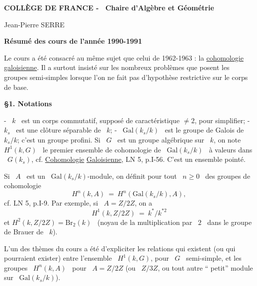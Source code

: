 \textbf{COLLÈGE DE FRANCE - \ Chaire d'Algèbre et Géométrie}

Jean-Pierre SERRE

\textbf{Résumé des cours de l'année 1990-1991}

Le cours a été consacré au même sujet que celui de 1962-1963 : la \uline{cohomologie}
\uline{galoisienne}. Il a surtout insisté sur les nombreux problèmes que posent les
groupes semi-simples lorsque l'on ne fait pas d'hypothèse restrictive sur
le corps de base.

\textbf{§1. Notations}

- \ $k$ \ est un corps commutatif, supposé de caractéristique $\neq 2$, pour simplifier;
- $k_s$ \ est une clôture séparable de \ $k$;
- \ $\mathrm{Gal}(k_s/k)$ \ est le groupe de Galois de \ $k_s/k$; c'est un groupe profini.
Si \ $G$ \ est un groupe algébrique sur \ $k$, on note \ $H^1(k, G)$ \ le premier
ensemble de cohomologie de \ $\mathrm{Gal}(k_s/k)$ \ à valeurs dans \ $G(k_s)$, cf. \uline{Cohomologie}
\uline{Galoisienne}, LN 5, p.I-56. C'est un ensemble pointé.

Si \ $A$ \ est un \ $\mathrm{Gal}(k_s/k)$-module, on définit pour tout \ $n \geqslant 0$ \ des groupes de
cohomologie
\[ H^n(k, A) \ = \ H^n(\mathrm{Gal}(k_s/k), A), \]
cf. LN 5, p.I-9.
Par exemple, si \ $A = Z/2Z$, on a
\[ H^1(k, Z/2Z) \ = \ k^*/k^{*2} \]
et
\quad $H^2(k, Z/2Z) = \mathrm{Br}_2(k)$ \ (noyau de la multiplication par \ $2$ \ dans le groupe
de Brauer de \ $k$).

L'un des thèmes du cours a été d'expliciter les relations qui existent
(ou qui pourraient exister) entre l'ensemble \ $H^1(k, G)$, pour \ $G$ \ semi-simple,
et les groupes \ $H^n(k, A)$ \ pour \ $A = Z/2Z$ (ou \ $Z/3Z$, ou tout autre `` petit''
module sur \ $\mathrm{Gal}(k_s/k)$).

